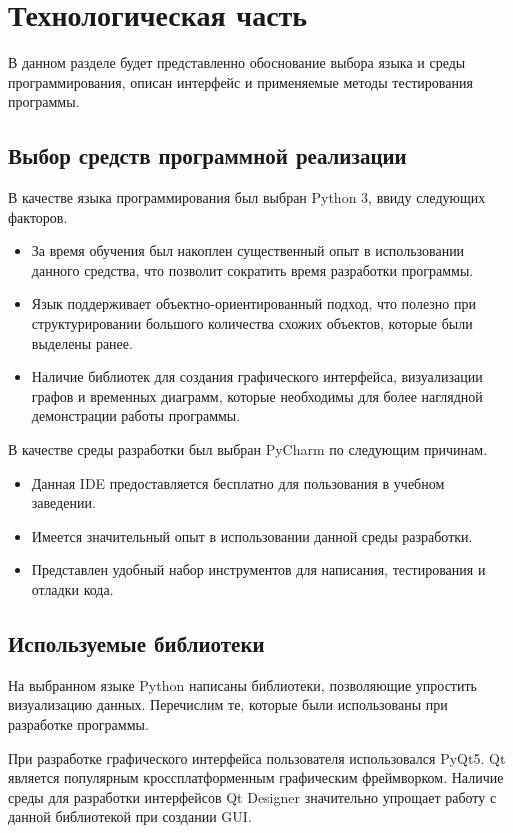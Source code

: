 \section{Технологическая часть}

В данном разделе будет представленно обоснование выбора языка и среды программирования, описан интерфейс и применяемые методы тестирования программы.

\subsection{Выбор средств программной реализации}
В качестве языка программирования был выбран Python 3, ввиду следующих факторов.

\begin{itemize}
	\item За время обучения был накоплен существенный опыт в использовании данного средства, что позволит сократить время разработки программы.
	\item Язык поддерживает объектно-ориентированный подход, что полезно при структурировании большого количества схожих объектов, которые были выделены ранее.
	\item Наличие библиотек для создания графического интерфейса, визуализации графов и временных диаграмм, которые необходимы для более наглядной демонстрации работы программы.
\end{itemize}
\qquad
В качестве среды разработки был выбран PyCharm по следующим причинам.
\begin{itemize}
	\item Данная IDE предоставляется бесплатно для пользования в учебном заведении\cite{tech:pycharm}.
	\item Имеется значительный опыт в использовании данной среды разработки.
	\item Представлен удобный набор инструментов для написания, тестирования и отладки кода.
\end{itemize}

\subsection{Используемые библиотеки}
На выбранном языке Python написаны библиотеки, позволяющие упростить визуализацию данных. Перечислим те, которые были использованы при разработке программы.

При разработке графического интерфейса пользователя использовался
PyQt5. Qt является популярным кроссплатформенным графическим фреймворком\cite{libs:pyqt}. Наличие среды для разработки интерфейсов Qt Designer значительно упрощает работу с данной библиотекой при создании GUI.

